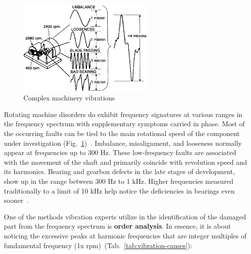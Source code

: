 \begin{figure}[h]
	\centering
	\includegraphics[width=0.6\textwidth]{assets/complex-vibrations.png}
	\caption{Complex machinery vibrations~\cite{davies_handbook_2012}}
	\label{fig:machinery-vibrations}
\end{figure}

Rotating machine disorders do exhibit frequency signatures at various ranges in the frequency spectrum with supplementary symptoms carried in phase. Most of the occurring faults can be tied to the main rotational speed of the component under investigation (Fig.~\ref{fig:machinery-vibrations})~\cite{davies_handbook_2012}. Imbalance, misalignment, and looseness normally appear at frequencies up to 300 Hz. These low-frequency faults are associated with the movement of the shaft and primarily coincide with revolution speed and its harmonics. Bearing and gearbox defects in the late stages of development, show up in the range between 300 Hz to 1 kHz. Higher frequencies measured traditionally to a limit of 10 kHz help notice the deficiencies in bearings even sooner~\cite{torres_automatic_2022}.

One of the methods vibration experts utilize in the identification of the damaged part from the frequency spectrum is \textbf{order analysis}. In essence, it is about noticing the excessive peaks at harmonic frequencies that are integer multiples of fundamental frequency (1x rpm)~(Tab.~\ref{tab:vibration-causes}):

